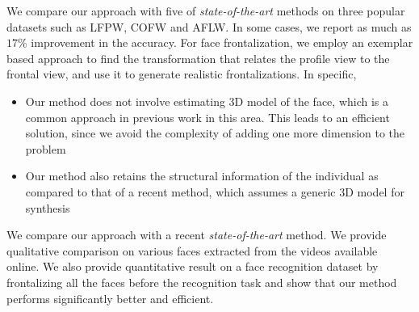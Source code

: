 We compare our approach with five of \textit{state-of-the-art} methods on
three popular datasets such as LFPW, COFW and AFLW. In some cases, we
report as much as $17$\% improvement in the accuracy.
\newline
For face frontalization, we employ an exemplar based approach to find the 
transformation that relates the profile view to the frontal view, and use it 
to generate realistic frontalizations. In specific,
\begin{itemize}
\item{Our method does not involve estimating 3D model of the face,
which is a common approach in previous work in this area. This
leads to an efficient solution, since we avoid the complexity of
adding one more dimension to the problem}
\item{Our method also retains the structural information of the individual 
as compared to that of a recent method, which assumes a generic 3D model
for synthesis}
\end{itemize}

We compare our approach with a recent \textit{state-of-the-art} method. We
provide qualitative comparison on various faces extracted from the videos
available online. We also provide quantitative result on a face recognition 
dataset by frontalizing all the faces before the recognition task and show 
that our method performs significantly better and efficient.  
